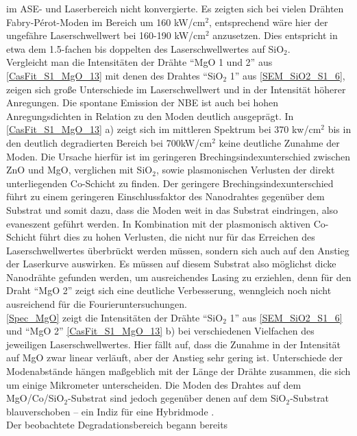 im ASE- und Laserbereich nicht konvergierte. Es zeigten sich bei vielen Drähten
Fabry-Pérot-Moden im Bereich um 160 kW/cm$^\text{2}$, entsprechend wäre hier der
ungefähre Laserschwellwert bei 160-190 kW/cm$^\text{2}$ anzusetzen. Dies
entspricht in etwa dem 1.5-fachen bis doppelten des Laserschwellwertes auf
SiO$_\text{2}$. \\ Vergleicht man die Intensitäten der Drähte ``MgO 1 und 2''
aus \autoref{CasFit_S1_MgO_13} mit denen des Drahtes ``SiO$_\text{2}$ 1'' aus
\autoref{SEM_SiO2_S1_6}, zeigen sich große Unterschiede im Laserschwellwert und
in der Intensität höherer Anregungen. Die spontane Emission der NBE ist auch bei
hohen Anregungsdichten in Relation zu den Moden deutlich ausgeprägt. In
\autoref{CasFit_S1_MgO_13} a) zeigt sich im mittleren Spektrum bei 370
kw/cm$^\text{2}$ bis in den deutlich degradierten Bereich bei
700kW/cm$^\text{2}$ keine deutliche Zunahme der Moden. Die Ursache hierfür ist
im geringeren Brechingsindexunterschied zwischen ZnO und MgO, verglichen mit
SiO$_\text{2}$, sowie plasmonischen Verlusten der direkt unterliegenden
Co-Schicht zu finden. Der geringere Brechingsindexunterschied führt zu einem
geringeren Einschlussfaktor des Nanodrahtes gegenüber dem Substrat und somit
dazu, dass die Moden weit in das Substrat eindringen, also evaneszent geführt
werden. In Kombination mit der plasmonisch aktiven Co-Schicht führt dies zu
hohen Verlusten, die nicht nur für das Erreichen des Laserschwellwertes
überbrückt werden müssen, sondern sich auch auf den Anstieg der Laserkurve
auswirken. Es müssen auf diesem Substrat also möglichst dicke Nanodrähte
gefunden werden, um ausreichendes Lasing zu erziehlen, denn für den Draht ``MgO
2'' zeigt sich eine deutliche Verbesserung, wenngleich noch nicht ausreichend
für die Fourieruntersuchungen.\\ \autoref{Spec_MgO} zeigt die Intensitäten der
Drähte ``SiO$_\text{2}$ 1'' aus \autoref{SEM_SiO2_S1_6} und ``MgO 2''
\autoref{CasFit_S1_MgO_13} b) bei verschiedenen Vielfachen des jeweiligen
Laserschwellwertes. Hier fällt auf, dass die Zunahme in der Intensität auf MgO
zwar linear verläuft, aber der Anstieg sehr gering ist. Unterschiede der
Modenabstände hängen maßgeblich mit der Länge der Drähte zusammen, die sich um
einige Mikrometer unterscheiden. Die Moden des Drahtes auf dem
MgO/Co/SiO$_\text{2}$-Substrat sind jedoch gegenüber denen auf dem
SiO$_\text{2}$-Substrat blauverschoben – ein Indiz für eine Hybridmode
\cite{Sidiropoulos.2014}. \\ Der beobachtete Degradationsbereich begann bereits
